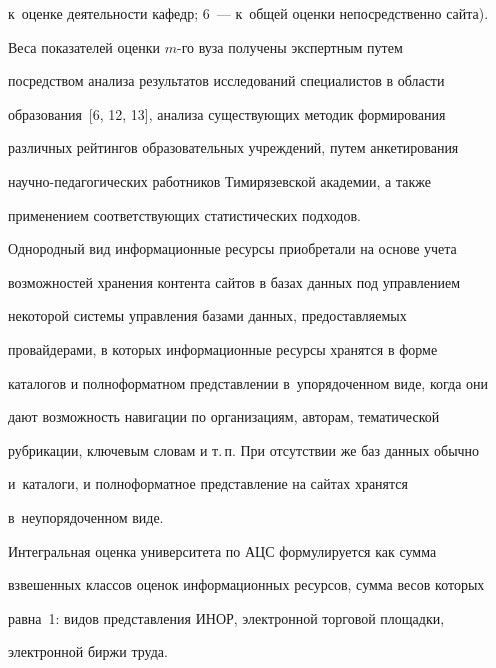 к~оценке деятельности кафедр; 6~--- к~общей оценки непосредственно сайта).


{





}


  


  Веса показателей оценки $m$-го вуза получены экспертным путем 


посредством анализа результатов исследований специалистов в области 


образования~[6, 12, 13], анализа существующих методик формирования 


различных рейтингов образовательных учреждений, путем анкетирования  


на\-уч\-но-пе\-да\-го\-ги\-че\-ских работников Тимирязевской академии, а также 


применением соответствующих статистических подходов. 


  


  Однородный вид информационные ресурсы приобретали на основе учета 


возможностей хранения контента сайтов в базах данных под управлением 


некоторой сис\-те\-мы управ\-ле\-ния базами данных, предоставляемых 


провайдерами, в которых информационные ресурсы хранятся в форме 


каталогов и полноформатном представлении в~упорядоченном виде, когда они 


дают возможность навигации по организациям, авторам, тематической 


рубрикации, ключевым словам и т.\,п. При отсутствии же баз данных обычно 


и~каталоги, и полноформатное представление на сайтах хранятся 


в~неупорядоченном виде.


  


  Интегральная оценка университета по АЦС формулируется как сумма 


взвешенных классов оценок информационных ресурсов, сумма весов которых 


равна~1: видов представления ИНОР, электронной торговой площадки, 


электронной биржи труда.




